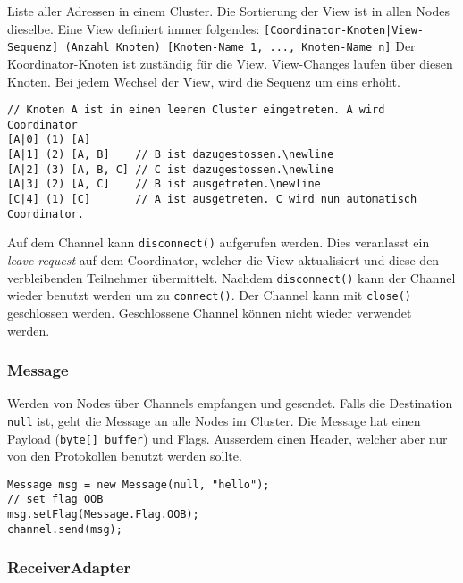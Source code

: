 Liste aller Adressen in einem Cluster. Die Sortierung der View ist in allen Nodes dieselbe. Eine View definiert immer folgendes:	
\newline
\verb/[Coordinator-Knoten|View-Sequenz] (Anzahl Knoten) [Knoten-Name 1, ..., Knoten-Name n]/
\newline
Der Koordinator-Knoten ist zuständig für die View. View-Changes laufen über diesen Knoten. Bei jedem Wechsel der View, wird die Sequenz um eins erhöht.
\begin{lstlisting}[caption=View]
// Knoten A ist in einen leeren Cluster eingetreten. A wird Coordinator
[A|0] (1) [A]
[A|1] (2) [A, B] 	// B ist dazugestossen.\newline
[A|2] (3) [A, B, C] // C ist dazugestossen.\newline
[A|3] (2) [A, C] 	// B ist ausgetreten.\newline
[C|4] (1) [C] 		// A ist ausgetreten. C wird nun automatisch Coordinator.
\end{lstlisting}
Auf dem Channel kann \verb|disconnect()| aufgerufen werden. Dies veranlasst ein \emph{leave request} auf dem Coordinator, welcher die View aktualisiert und diese den verbleibenden Teilnehmer übermittelt. Nachdem \verb|disconnect()| kann der Channel wieder benutzt werden um zu \verb|connect()|. Der Channel kann mit \verb|close()| geschlossen werden. Geschlossene Channel können nicht wieder verwendet werden.
		
\subsubsection{Message}

Werden von Nodes über Channels empfangen und gesendet. Falls die Destination \verb|null| ist, geht die Message an alle Nodes im Cluster. Die Message hat einen Payload (\verb|byte[] buffer|) und Flags. Ausserdem einen Header, welcher aber nur von den Protokollen benutzt werden sollte.
	
\begin{lstlisting}[caption=Nachricht senden]
Message msg = new Message(null, "hello");
// set flag OOB
msg.setFlag(Message.Flag.OOB);
channel.send(msg);
\end{lstlisting}

\newpage
	
\subsubsection{ReceiverAdapter}


